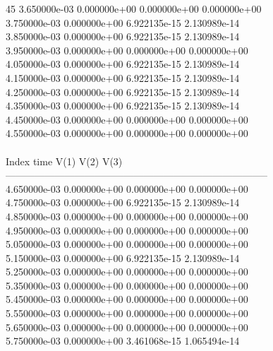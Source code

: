 45	3.650000e-03	0.000000e+00	0.000000e+00	0.000000e+00	\\ 	3.750000e-03	0.000000e+00	6.922135e-15	2.130989e-14	\\ 	3.850000e-03	0.000000e+00	6.922135e-15	2.130989e-14	\\ 	3.950000e-03	0.000000e+00	0.000000e+00	0.000000e+00	\\ 	4.050000e-03	0.000000e+00	6.922135e-15	2.130989e-14	\\ 	4.150000e-03	0.000000e+00	6.922135e-15	2.130989e-14	\\ 	4.250000e-03	0.000000e+00	6.922135e-15	2.130989e-14	\\ 	4.350000e-03	0.000000e+00	6.922135e-15	2.130989e-14	\\ 	4.450000e-03	0.000000e+00	0.000000e+00	0.000000e+00	\\ 	4.550000e-03	0.000000e+00	0.000000e+00	0.000000e+00	\\ \hline
\\ \hline
Index   time            V(1)            V(2)            V(3)            \\ \hline
--------------------------------------------------------------------------------\\ 	4.650000e-03	0.000000e+00	0.000000e+00	0.000000e+00	\\ 	4.750000e-03	0.000000e+00	6.922135e-15	2.130989e-14	\\ 	4.850000e-03	0.000000e+00	0.000000e+00	0.000000e+00	\\ 	4.950000e-03	0.000000e+00	0.000000e+00	0.000000e+00	\\ 	5.050000e-03	0.000000e+00	0.000000e+00	0.000000e+00	\\ 	5.150000e-03	0.000000e+00	6.922135e-15	2.130989e-14	\\ 	5.250000e-03	0.000000e+00	0.000000e+00	0.000000e+00	\\ 	5.350000e-03	0.000000e+00	0.000000e+00	0.000000e+00	\\ 	5.450000e-03	0.000000e+00	0.000000e+00	0.000000e+00	\\ 	5.550000e-03	0.000000e+00	0.000000e+00	0.000000e+00	\\ 	5.650000e-03	0.000000e+00	0.000000e+00	0.000000e+00	\\ 	5.750000e-03	0.000000e+00	3.461068e-15	1.065494e-14	\\ \hline
